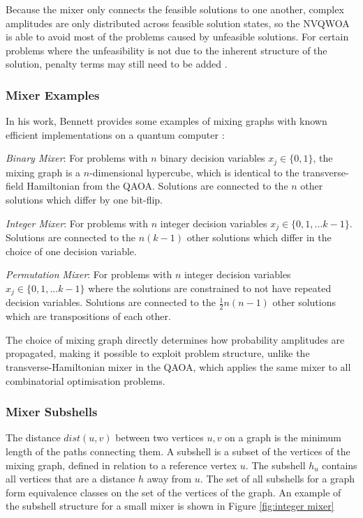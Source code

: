 Because the mixer only connects the feasible solutions to one another, complex amplitudes are only distributed across feasible solution states, so the NVQWOA is able to avoid most of the problems caused by unfeasible solutions. For certain problems where the unfeasibility is not due to the inherent structure of the solution, penalty terms may still need to be added \cite{bennett2024nonvariational,bennett2024analysisnonvariationalquantumwalkbased}.

\subsubsection{Mixer Examples}

In his work, Bennett provides some examples of mixing graphs with known efficient implementations on a quantum computer \cite{bennett2024nonvariational,bennett2024analysisnonvariationalquantumwalkbased}:

\textit{Binary Mixer}: For problems with $n$ binary decision variables $x_j\in\{0,1\}$, the mixing graph is a $n$-dimensional hypercube, which is identical to the transverse-field Hamiltonian from the QAOA. Solutions are connected to the $n$ other solutions which differ by one bit-flip.

\textit{Integer Mixer}: For problems with $n$ integer decision variables $x_j\in\{0,1,...k-1\}$. Solutions are connected to the $n(k-1)$ other solutions which differ in the choice of one decision variable.

\textit{Permutation Mixer}: For problems with $n$ integer decision variables $x_j\in\{0,1,...k-1\}$ where the solutions are constrained to not have repeated decision variables. Solutions are connected to the $\frac{1}{2}n(n-1)$ other solutions which are transpositions of each other.

The choice of mixing graph directly determines how probability amplitudes are propagated, making it possible to exploit problem structure, unlike the transverse-Hamiltonian mixer in the QAOA, which applies the same mixer to all combinatorial optimisation problems\cite{QAOA}.



\subsubsection{Mixer Subshells}\label{sec:subshell}
The distance $dist(u,v)$ between two vertices $u,v$ on a graph is the minimum length of the paths connecting them. A subshell is a subset of the vertices of the mixing graph, defined in relation to a reference vertex $u$. The subshell $h_u$ contains all vertices that are a distance $h$ away from $u$. The set of all subshells for a graph form equivalence classes on the set of the vertices of the graph. An example of the subshell structure for a small mixer is shown in Figure \ref{fig:integer mixer}

